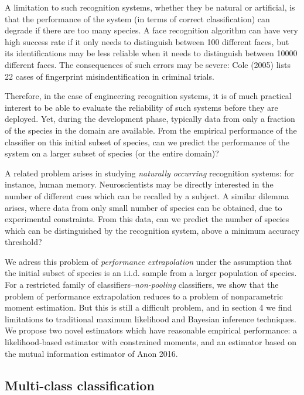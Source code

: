 \documentclass{article}
\begin{document}
A limitation to such recognition systems, whether they be natural or
artificial, is that the performance of the system (in terms of correct
classification) can degrade if there are too many species.  A face
recognition algorithm can have very high success rate if it only needs
to distinguish between 100 different faces, but its identifications
may be less reliable when it needs to distinguish between 10000
different faces.  The consequences of such errors may be severe: Cole
(2005) lists 22 cases of fingerprint misindentification in criminal
trials.

Therefore, in the case of engineering recognition systems, it is of
much practical interest to be able to evaluate the reliability of such
systems before they are deployed.  Yet, during the development phase,
typically data from only a fraction of the species in the domain are
available.  From the empirical performance of the classifier on this
initial subset of species, can we predict the performance of the
system on a larger subset of species (or the entire domain)?

A related problem arises in studying \emph{naturally occurring}
recognition systems: for instance, human memory.  Neuroscientists may
be directly interested in the number of different cues which can be
recalled by a subject.  A similar dilemma arises, where data from only
small number of species can be obtained, due to experimental
constraints.  From this data, can we predict the number of species
which can be distinguished by the recognition system, above a minimum
accuracy threshold?

We adress this problem of \emph{performance extrapolation} under the
assumption that the initial subset of species is an i.i.d. sample from
a larger population of species.  For a restricted family of
classifiers--\emph{non-pooling} classifiers, we show that the problem
of performance extrapolation reduces to a problem of nonparametric
moment estimation.  But this is still a difficult problem, and in
section 4 we find limitations to traditional maximum likelihood and
Bayesian inference techniques.  We propose two novel estimators which have reasonable empirical performance:
a likelihood-based estimator with constrained moments,
and an estimator based on the mutual information estimator of Anon 2016.

\subsection{Multi-class classification}
\end{document}
